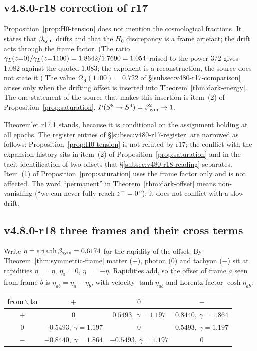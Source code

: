 \subsection*{v4.8.0-r18 correction of r17}
\label{subsec:v480-r18-r17-correction}

Proposition~\ref{prop:H0-tension} does not mention the cosmological fractions.  It states that \(\beta_{\mathrm{sym}}\) drifts
and that the \(H_0\) discrepancy is a frame artefact; the drift acts through the frame factor.  (The ratio
\(\gamma_L(z{=}0)/\gamma_L(z{=}1100)=1.8642/1.7690=1.054\) raised to the power \(3/2\) gives \(1.082\) against the quoted
\(1.083\); the exponent is a reconstruction, the source does not state it.)  The value
\(\Omega_\Lambda(1100)=0.722\) of \S\ref{subsec:v480-r17-comparison} arises only when the drifting offset is inserted
into Theorem~\ref{thm:dark-energy}.  The one statement of the source that makes this insertion is item~(2) of
Proposition~\ref{prop:saturation}, \(P(S^8\to S^4)=\beta_{\mathrm{sym}}^2\to1\).

Theoremlet r17.1 stands, because it is conditional on the assignment holding at all epochs.  The register entries of
\S\ref{subsec:v480-r17-register} are narrowed as follows: Proposition~\ref{prop:H0-tension} is not refuted by r17;
the conflict with the expansion history sits in item~(2) of Proposition~\ref{prop:saturation} and in the tacit
identification of two offsets that \S\ref{subsec:v480-r18-reading} separates.  Item~(1) of
Proposition~\ref{prop:saturation} uses the frame factor only and is not affected.  The word ``permanent'' in
Theorem~\ref{thm:dark-offset} means non-vanishing (``we can never fully reach \(z^-=0\)''); it does not
conflict with a slow drift.

\subsection*{v4.8.0-r18 three frames and their cross terms}
\label{subsec:v480-r18-cross-terms}

Write \(\eta=\operatorname{artanh}\beta_{\mathrm{sym}}=0.6174\) for the rapidity of the offset.  By
Theorem~\ref{thm:symmetric-frame} matter (\(+\)), photon (\(0\)) and tachyon (\(-\)) sit at rapidities
\(\eta_+=\eta\), \(\eta_0=0\), \(\eta_-=-\eta\).  Rapidities add, so the offset of frame \(a\) seen from frame \(b\) is
\(\eta_{ab}=\eta_a-\eta_b\), with velocity \(\tanh\eta_{ab}\) and Lorentz factor \(\cosh\eta_{ab}\):
\begin{center}
\small
\begin{tabular}{@{}c|ccc@{}}
\toprule
from\,\(\backslash\)\,to & \(+\) & \(0\) & \(-\)\\
\midrule
\(+\) & \(0\) & \(0.5493,\ \gamma=1.197\) & \(0.8440,\ \gamma=1.864\)\\
\(0\) & \(-0.5493,\ \gamma=1.197\) & \(0\) & \(0.5493,\ \gamma=1.197\)\\
\(-\) & \(-0.8440,\ \gamma=1.864\) & \(-0.5493,\ \gamma=1.197\) & \(0\)\\
\bottomrule
\end{tabular}
\end{center}

